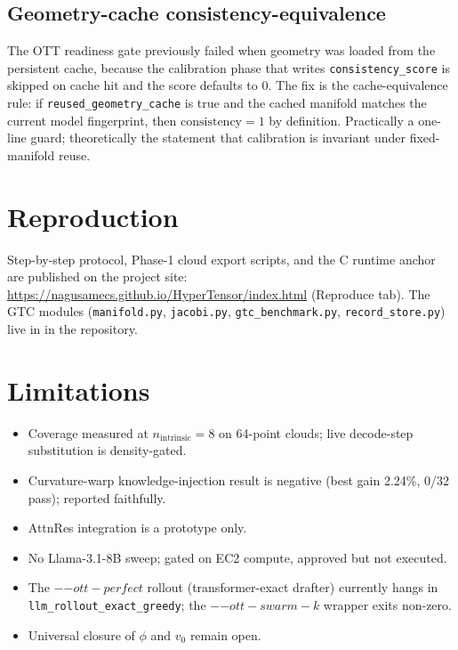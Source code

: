 \documentclass[11pt]{article}
\begin{document}
\subsection{Geometry-cache consistency-equivalence}

The OTT readiness gate previously failed when geometry was loaded from the
persistent cache, because the calibration phase that writes
\texttt{consistency\_score} is skipped on cache hit and the score defaults to
0. The fix is the cache-equivalence rule: if \texttt{reused\_geometry\_cache}
is true and the cached manifold matches the current model fingerprint, then
$\text{consistency}=1$ by definition. Practically a one-line guard;
theoretically the statement that calibration is invariant under fixed-manifold
reuse.



\section{Reproduction}
Step-by-step protocol, Phase-1 cloud export scripts, and the C runtime
anchor are published on the project site:
\url{https://nagusamecs.github.io/HyperTensor/index.html} (Reproduce tab).
The GTC modules (\texttt{manifold.py}, \texttt{jacobi.py},
\texttt{gtc\_benchmark.py}, \texttt{record\_store.py}) live in
 in the repository.

\section{Limitations}

\begin{itemize}
  \item Coverage measured at $n_{\mathrm{intrinsic}}=8$ on 64-point clouds;
        live decode-step substitution is density-gated.
  \item Curvature-warp knowledge-injection result is negative (best
        gain 2.24\%, 0/32 pass); reported faithfully.
  \item AttnRes integration is a prototype only.
  \item No Llama-3.1-8B sweep; gated on EC2 compute, approved but not
        executed.
  \item The $-{-ott-perfect}$ rollout (transformer-exact drafter)
        currently hangs in \texttt{llm\_rollout\_exact\_greedy}; the
        $-{-ott-swarm-k}$ wrapper exits non-zero.
  \item Universal closure of $\phi$ and $v_0$ remain open.
\end{itemize}
\end{document}
